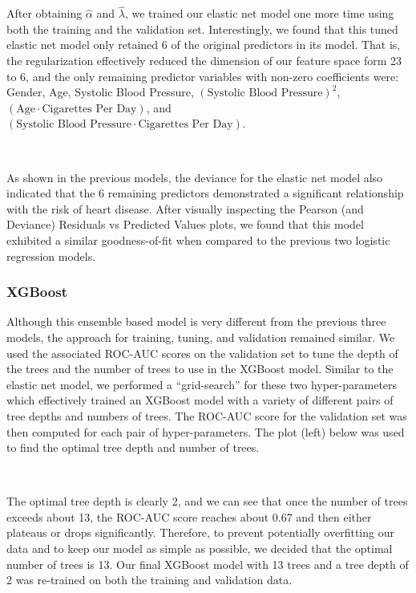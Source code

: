 \documentclass[10pt]{article}
\begin{document}
After obtaining $\hat{\alpha}$ and $\hat{\lambda}$, we trained our elastic net model one more time using both the training and the validation set. Interestingly, we found that this tuned elastic net model only retained 6 of the original predictors in its model. That is, the regularization effectively reduced the dimension of our feature space form 23 to 6, and the only remaining predictor variables with non-zero coefficients were: Gender, Age, Systolic Blood Pressure, $(\text{Systolic Blood Pressure})^2$, $(\text{Age} \cdot \text{Cigarettes Per Day})$, and $(\text{Systolic Blood Pressure} \cdot \text{Cigarettes Per Day})$. 

\

As shown in the previous models, the deviance for the elastic net model also indicated that the 6 remaining predictors demonstrated a significant relationship with the risk of heart disease. After visually inspecting the Pearson (and Deviance) Residuals vs Predicted Values plots, we found that this model exhibited a similar goodness-of-fit when compared to the previous two logistic regression models.

\subsubsection*{XGBoost}

Although this ensemble based model is very different from the previous three models, the approach for training, tuning, and validation remained similar. We used the associated ROC-AUC scores on the validation set to tune the depth of the trees and the number of trees to use in the XGBoost model. Similar to the elastic net model, we performed a ``grid-search'' for these two hyper-parameters which effectively trained an XGBoost model with a variety of different pairs of tree depths and numbers of trees. The ROC-AUC score for the validation set was then computed for each pair of hyper-parameters. The plot (left) below was used to find the optimal tree depth and number of trees. 

\

The optimal tree depth is clearly 2, and we can see that once the number of trees exceeds about 13, the ROC-AUC score reaches about 0.67 and then either plateaus or drops significantly. Therefore, to prevent potentially overfitting our data and to keep our model as simple as possible, we decided that the optimal number of trees is 13. Our final XGBoost model with 13 trees and a tree depth of 2 was re-trained on both the training and validation data.
\end{document}
